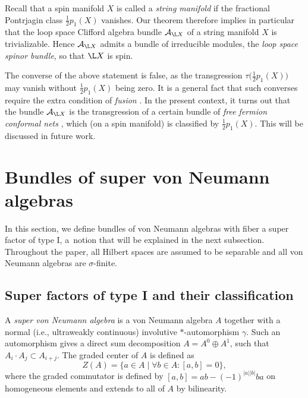 Recall that a spin manifold $X$ is called a \emph{string manifold} if the fractional Pontrjagin class $\frac{1}{2}p_1(X)$ vanishes.
Our theorem therefore implies in particular that the loop space Clifford algebra bundle $\mathcal{A}_{\L X}$ of a string manifold $X$ is trivializable.
Hence $\mathcal{A}_{\L X}$ admits a bundle of irreducible modules, the \emph{loop space spinor bundle}, so that $\L X$ is spin.

The converse of the above statement is false, as the transgression $\tau\big(\frac{1}{2}p_1(X)\big)$ may vanish without $\frac{1}{2}p_1(X)$ being zero.
It is a general fact that such converses require the extra condition of \emph{fusion} \cite{WaldorfTransgressionI, WaldorfTransgressionII, WaldorfTransgressionIII}.
In the present context, it turns out that the bundle $\mathcal{A}_{\L X}$ is the transgression of a certain bundle of \emph{free fermion conformal nets} \cite{DouglasHenriquesModularFormsConformalNets}, which (on a spin manifold) is classified by $\frac{1}{2}p_1(X)$.
This will be discussed in future work.



\section{Bundles of super von Neumann algebras}

In this section, we define bundles of von Neumann algebras with fiber a super factor of type I, a~notion that will be explained in the next subsection.
Throughout the paper, all Hilbert spaces are assumed to be separable and all von Neumann algebras are $\sigma$-finite.

\subsection{Super factors of type I and their classification} \label{SectionSuperFactors}

A \emph{super von Neumann algebra} is a von Neumann algebra $A$ together with a normal (i.e., ultraweakly continuous) involutive $*$-automorphism $\gamma$.
Such an automorphism gives a direct sum decomposition $A = A^0 \oplus A^1$, such that $A_i \cdot A_j \subset A_{i+j}$.
The graded center of $A$ is defined as
\begin{equation*}
Z(A) = \{a \in A \mid \forall b \in A\colon  [a, b] = 0 \},
\end{equation*}
where the graded commutator is defined by $[a, b] = ab - (-1)^{|a||b|} ba$ on homogeneous elements and extends to all of $A$ by bilinearity.

